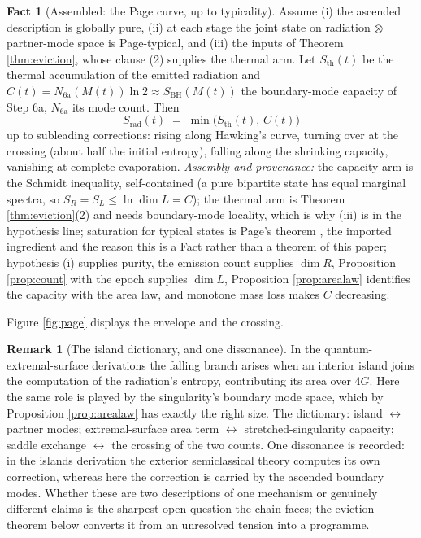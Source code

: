\documentclass[11pt]{article}
\theoremstyle{definition}
\newtheorem{remark}[theorem]{Remark}
\newtheorem{fact}[theorem]{Fact}
\newcommand{\Sth}{S_{\mathrm{th}}}
\begin{document}
\begin{fact}[Assembled: the Page curve, up to typicality]\label{thm:pagecurve}
Assume (i) the ascended description is globally pure, (ii) at each stage the joint state on radiation $\otimes$ partner-mode space is Page-typical, and (iii) the inputs of Theorem \ref{thm:eviction}, whose clause (2) supplies the thermal arm. Let $\Sth(t)$ be the thermal accumulation of the emitted radiation and $C(t) = N_{\mathrm{6a}}(M(t))\ln 2 \approx S_{\mathrm{BH}}(M(t))$ the boundary-mode capacity of Step 6a, $N_{\mathrm{6a}}$ its mode count. Then
\[
S_{\mathrm{rad}}(t) \;=\; \min\bigl(\Sth(t),\, C(t)\bigr)
\]
up to subleading corrections: rising along Hawking's curve, turning over at the crossing (about half the initial entropy), falling along the shrinking capacity, vanishing at complete evaporation. \emph{Assembly and provenance:} the capacity arm is the Schmidt inequality, self-contained (a pure bipartite state has equal marginal spectra, so $S_R = S_L \leq \ln\dim L = C$); the thermal arm is Theorem \ref{thm:eviction}(2) and needs boundary-mode locality, which is why (iii) is in the hypothesis line; saturation for typical states is Page's theorem \cite{Page1993}, the imported ingredient and the reason this is a Fact rather than a theorem of this paper; hypothesis (i) supplies purity, the emission count supplies $\dim R$, Proposition \ref{prop:count} with the epoch supplies $\dim L$, Proposition \ref{prop:arealaw} identifies the capacity with the area law, and monotone mass loss makes $C$ decreasing.
\end{fact}

Figure \ref{fig:page} displays the envelope and the crossing.

\begin{remark}[The island dictionary, and one dissonance]\label{rem:islands}
In the quantum-extremal-surface derivations \cite{Penington2020, AEMM2019} the falling branch arises when an interior island joins the computation of the radiation's entropy, contributing its area over $4G$. Here the same role is played by the singularity's boundary mode space, which by Proposition \ref{prop:arealaw} has exactly the right size. The dictionary: island $\leftrightarrow$ partner modes; extremal-surface area term $\leftrightarrow$ stretched-singularity capacity; saddle exchange $\leftrightarrow$ the crossing of the two counts. One dissonance is recorded: in the islands derivation the exterior semiclassical theory computes its own correction, whereas here the correction is carried by the ascended boundary modes. Whether these are two descriptions of one mechanism or genuinely different claims is the sharpest open question the chain faces; the eviction theorem below converts it from an unresolved tension into a programme.
\end{remark}
\end{document}
